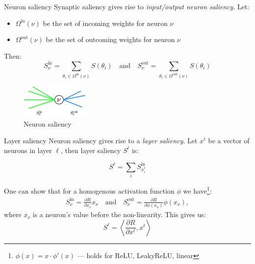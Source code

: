 \documentclass[10pt, handout]{beamer}
\begin{document}
\begin{frame}{Neuron saliency}
\pause
Synaptic saliency gives rise to \textit{input/output neuron saliency}.
\pause
Let:
\begin{itemize}
    \item $\Omega^\text{in}(\nu)$ be the set of incoming weights for neuron $\nu$
    \item $\Omega^\text{out}(\nu)$ be the set of outcoming weights for neuron $\nu$
\end{itemize}

\pause
Then:
\begin{equation}
    S^\text{in}_\nu = \sum_{\theta_i \in \Omega^\text{in}(\nu)} S(\theta_i)
    \quad\text{and}\quad
    S^\text{out}_\nu = \sum_{\theta_i \in \Omega^\text{out}(\nu)} S(\theta_i)
\end{equation}
\begin{figure}
    \centering
    \includegraphics[width=0.3\textwidth]{images/neuron-saliency.png}
    \caption{Neuron saliency}
    \label{fig:neuron-saliency}
\end{figure}
\end{frame}

\begin{frame}{Layer saliency}
\pause
Neuron saliency gives rise to a \textit{layer saliency}.
Let $x^\ell$ be a vector of neurons in layer $\ell$, then layer saliency $S^\ell$ is:

\begin{equation}
    S^\ell = \sum_{i} S_{x^\ell_i}^\text{in}
\end{equation}

\pause
One can show that for a homogenous activation function $\phi$ we have\footnote{$\phi(x) = x \cdot \phi'(x)$ --- holds for ReLU, LeakyReLU, linear}:
\begin{align}
    S^\text{in}_\nu = \frac{\partial R}{\partial x_\nu} x_\nu
    \quad\text{and}\quad
    S^\text{out}_\nu = \frac{\partial R}{\partial \phi(x_\nu)} \phi(x_\nu),
\end{align}
where $x_\nu$ is a neuron's value before the non-linearity.
\pause
This gives us:
\begin{equation}
    S^\ell = \left\langle \frac{\partial R}{\partial x^\ell}, x^\ell \right\rangle
\end{equation}
\end{frame}
\end{document}
